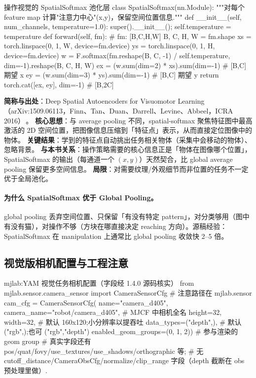 \begin{codebox}[Python]{操作视觉的 SpatialSoftmax 池化层}
class SpatialSoftmax(nn.Module):
    """对每个 feature map 计算"注意力中心"(x,y)，保留空间位置信息."""
    def __init__(self, num_channels, temperature=1.0):
        super().__init__(); self.temperature = temperature
    def forward(self, fm):                      # fm: [B,C,H,W]
        B, C, H, W = fm.shape
        xs = torch.linspace(0, 1, W, device=fm.device)
        ys = torch.linspace(0, 1, H, device=fm.device)
        w = F.softmax(fm.reshape(B, C, -1) / self.temperature, dim=-1).reshape(B, C, H, W)
        ex = (w.sum(dim=2) * xs).sum(dim=-1)    # [B,C] 期望 x
        ey = (w.sum(dim=3) * ys).sum(dim=-1)    # [B,C] 期望 y
        return torch.cat([ex, ey], dim=-1)      # [B,2C]
\end{codebox}

\begin{paper}\label{paper:rlmc-manip-ssm}
\textbf{简称与出处}：Deep Spatial Autoencoders for Visuomotor Learning（arXiv:1509.06113，Finn、Tan、Duan、Darrell、Levine、Abbeel，ICRA 2016）\,\cite{finn2016dsae}。
\textbf{核心思想}：与 average pooling 不同，spatial-softmax 聚焦特征图中最高激活的 2D 空间位置，把图像信息压缩到「特征点」表示，从而直接定位图像中的物体。
\textbf{关键结果}：学到的特征点自动挑出任务相关物体（采集中会移动的物体）、忽略背景。
\textbf{与本书关系}：操作策略需要的核心信息正是「物体在图像哪个位置」，SpatialSoftmax 的输出（每通道一个 $(x,y)$）天然契合，比 global average pooling 保留更多空间信息。
\textbf{局限}：对需要纹理/外观细节而非位置的任务不一定优于全局池化。
\end{paper}

\paragraph{为什么 SpatialSoftmax 优于 Global Pooling。}global pooling 丢弃空间位置、只保留「有没有特定 pattern」，对分类够用（图中有没有猫），对操作不够（方块在哪直接决定 reaching 方向）。源稿经验：SpatialSoftmax 在 manipulation 上通常比 global pooling 收敛快 2--5 倍。

\subsection{视觉版相机配置与工程注意}
\label{sec:rlmc-manip-camcfg}

\begin{codebox}[Python]{mjlab:YAM 视觉任务相机配置（字段经 1.4.0 源码核实）}
from mjlab.sensor.camera_sensor import CameraSensorCfg  # 注意路径在 mjlab.sensor
cam_cfg = CameraSensorCfg(
    name="camera_d405", camera_name="robot/camera_d405",  # MJCF 中相机全名
    height=32, width=32,            # 默认 160x120;小分辨率以提吞吐
    data_types=("depth",),          # 默认 ("rgb",);也可 ("rgb","depth")
    enabled_geom_groups=(0, 1, 2))  # 参与渲染的 geom group
# 真实字段还有 pos/quat/fovy/use_textures/use_shadows/orthographic 等;
# 无 cutoff_distance/CameraObsCfg/normalize/clip_range 字段（depth 截断在 obs 预处理里做）.
\end{codebox}

